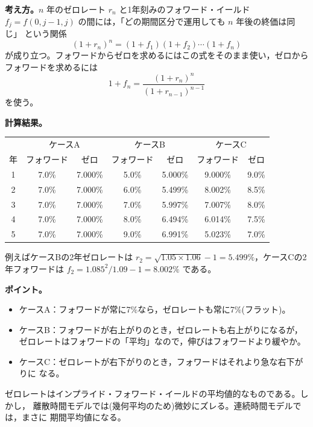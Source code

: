 \begin{answerbox}
\textbf{考え方。}$n$ 年のゼロレート $r_n$ と1年刻みのフォワード・イールド
$f_j = f(0,j-1,j)$ の間には，「どの期間区分で運用しても $n$ 年後の終価は同じ」
という関係
\[
(1+r_n)^n = (1+f_1)(1+f_2)\cdots(1+f_n)
\]
が成り立つ。フォワードからゼロを求めるにはこの式をそのまま使い，ゼロから
フォワードを求めるには
\[
1+f_n = \frac{(1+r_n)^n}{(1+r_{n-1})^{n-1}}
\]
を使う。

\medskip
\textbf{計算結果。}
\vspace{0.9em}
\begin{center}
\small
\begin{tabular}{c|cc|cc|cc}
\toprule
 & \multicolumn{2}{c|}{ケースA} & \multicolumn{2}{c|}{ケースB}
 & \multicolumn{2}{c}{ケースC}\\
年 & フォワード & ゼロ & フォワード & ゼロ & フォワード & ゼロ\\
\midrule
1 & 7.0\% & 7.000\% & 5.0\% & 5.000\% & 9.000\% & 9.0\%\\
2 & 7.0\% & 7.000\% & 6.0\% & 5.499\% & 8.002\% & 8.5\%\\
3 & 7.0\% & 7.000\% & 7.0\% & 5.997\% & 7.007\% & 8.0\%\\
4 & 7.0\% & 7.000\% & 8.0\% & 6.494\% & 6.014\% & 7.5\%\\
5 & 7.0\% & 7.000\% & 9.0\% & 6.991\% & 5.023\% & 7.0\%\\
\bottomrule
\end{tabular}
\end{center}
\vspace{0.9em}
例えばケースBの2年ゼロレートは
$r_2 = \sqrt{1.05\times 1.06} - 1 = 5.499\%$，ケースCの2年フォワードは
$f_2 = 1.085^2/1.09 - 1 = 8.002\%$ である。

\medskip
\textbf{ポイント。}
\begin{itemize}
\item ケースA：フォワードが常に7\%なら，ゼロレートも常に7\%(フラット)。
\item ケースB：フォワードが右上がりのとき，ゼロレートも右上がりになるが，
ゼロレートはフォワードの「平均」なので，伸びはフォワードより緩やか。
\item ケースC：ゼロレートが右下がりのとき，フォワードはそれより急な右下がりに
なる。
\end{itemize}
ゼロレートはインプライド・フォワード・イールドの平均値的なものである。しかし，
離散時間モデルでは(幾何平均のため)微妙にズレる。連続時間モデルでは，まさに
期間平均値になる。
\end{answerbox}

